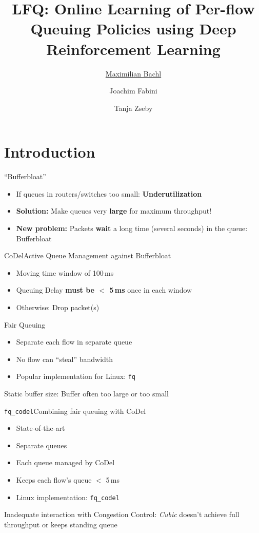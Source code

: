\documentclass[xcolor={dvipsnames}]{beamer}
\title{LFQ: Online Learning of Per-flow Queuing Policies using Deep Reinforcement Learning}
\author[M. Bachl et al.]{%
	\underline{Maximilian Bachl}\email{maximilian.bachl@tuwien.ac.at} \and Joachim Fabini \and Tanja Zseby
}
\institute{%
	Technische Universität Wien, Vienna, Austria
}
\date[\mydate]{\mydate}
\begin{document}
\maketitle

\section{Introduction}

\begin{frame}{``Bufferbloat''}
  \begin{itemize}
  \item If queues in routers/switches too small: \textbf{Underutilization}
  \item \textbf{Solution:} Make queues very \textbf{large} for maximum throughput!
  \item \textbf{New problem:} Packets \textbf{wait} a long time (several seconds) in the queue: Bufferbloat
  \end{itemize}
\end{frame}

\begin{frame}{CoDel}{Active Queue Management against Bufferbloat}
  \begin{itemize}
  \item Moving time window of 100\,ms
  \item Queuing Delay \textbf{must be $<$ 5\,ms} once in each window
  \item Otherwise: Drop packet(s)
  \end{itemize}
\end{frame}

\begin{frame}{Fair Queuing}
  \begin{itemize}
  \item Separate each flow in separate queue
  \item No flow can ``steal'' bandwidth
  \item Popular implementation for Linux: \texttt{fq}
  \end{itemize}
  \pause
  \begin{alertblock}{Static buffer size:}
	Buffer often too large or too small 
  \end{alertblock}
\end{frame}

\begin{frame}{\texttt{fq\_codel}}{Combining fair queuing with CoDel}
  \begin{itemize}
  \item State-of-the-art
  \item Separate queues
  \item Each queue managed by CoDel
  \item Keeps each flow's queue $<$ 5\,ms
  \item Linux implementation: \texttt{fq\_codel}
  \pause
  \end{itemize}
  \begin{alertblock}{Inadequate interaction with Congestion Control:}
	\textit{Cubic} doesn't achieve full throughput or keeps standing queue 
  \end{alertblock}
\end{frame}
\end{document}
